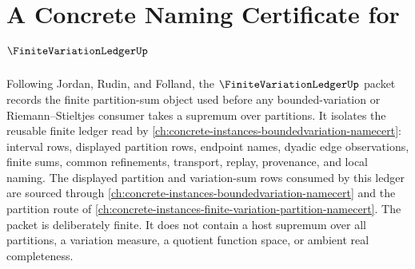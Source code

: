 \chapter{A Concrete Naming Certificate for $\FiniteVariationLedgerUp$}
\label{ch:concrete-instances-finite-variation-ledger-namecert}

Following Jordan, Rudin, and Folland, the $\FiniteVariationLedgerUp$ packet records the finite partition-sum object used before any bounded-variation or Riemann--Stieltjes consumer takes a supremum over partitions. It isolates the reusable finite ledger read by \autoref{ch:concrete-instances-boundedvariation-namecert}: interval rows, displayed partition rows, endpoint names, dyadic edge observations, finite sums, common refinements, transport, replay, provenance, and local naming. The displayed partition and variation-sum rows consumed by this ledger are sourced through \autoref{ch:concrete-instances-boundedvariation-namecert} and the partition route of \autoref{ch:concrete-instances-finite-variation-partition-namecert}. The packet is deliberately finite. It does not contain a host supremum over all partitions, a variation measure, a quotient function space, or ambient real completeness.

